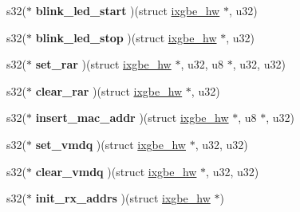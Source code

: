 \begin{DoxyCompactItemize}
\item 
\hypertarget{structixgbe__mac__operations_a2e0ac2fce8719c6d2319c512eb90a2a0}{
s32($\ast$ {\bfseries blink\_\-led\_\-start} )(struct \hyperlink{structixgbe__hw}{ixgbe\_\-hw} $\ast$, u32)}
\label{structixgbe__mac__operations_a2e0ac2fce8719c6d2319c512eb90a2a0}

\item 
\hypertarget{structixgbe__mac__operations_ab724c429efec4b4d0bd234b26ad47980}{
s32($\ast$ {\bfseries blink\_\-led\_\-stop} )(struct \hyperlink{structixgbe__hw}{ixgbe\_\-hw} $\ast$, u32)}
\label{structixgbe__mac__operations_ab724c429efec4b4d0bd234b26ad47980}

\item 
\hypertarget{structixgbe__mac__operations_a237a0034c92965f8e510e83bd0f10d14}{
s32($\ast$ {\bfseries set\_\-rar} )(struct \hyperlink{structixgbe__hw}{ixgbe\_\-hw} $\ast$, u32, u8 $\ast$, u32, u32)}
\label{structixgbe__mac__operations_a237a0034c92965f8e510e83bd0f10d14}

\item 
\hypertarget{structixgbe__mac__operations_a63468301a9ec3390f58f1efd3a36a29f}{
s32($\ast$ {\bfseries clear\_\-rar} )(struct \hyperlink{structixgbe__hw}{ixgbe\_\-hw} $\ast$, u32)}
\label{structixgbe__mac__operations_a63468301a9ec3390f58f1efd3a36a29f}

\item 
\hypertarget{structixgbe__mac__operations_abcef070126fbd0a876d01104495ae9b7}{
s32($\ast$ {\bfseries insert\_\-mac\_\-addr} )(struct \hyperlink{structixgbe__hw}{ixgbe\_\-hw} $\ast$, u8 $\ast$, u32)}
\label{structixgbe__mac__operations_abcef070126fbd0a876d01104495ae9b7}

\item 
\hypertarget{structixgbe__mac__operations_a91fd30a978bc70b9568aef0cc2d6cc9a}{
s32($\ast$ {\bfseries set\_\-vmdq} )(struct \hyperlink{structixgbe__hw}{ixgbe\_\-hw} $\ast$, u32, u32)}
\label{structixgbe__mac__operations_a91fd30a978bc70b9568aef0cc2d6cc9a}

\item 
\hypertarget{structixgbe__mac__operations_a8b5eeca45ba65ce09bc835e9642b070a}{
s32($\ast$ {\bfseries clear\_\-vmdq} )(struct \hyperlink{structixgbe__hw}{ixgbe\_\-hw} $\ast$, u32, u32)}
\label{structixgbe__mac__operations_a8b5eeca45ba65ce09bc835e9642b070a}

\item 
\hypertarget{structixgbe__mac__operations_a7c9b8096382ed138fc2ac7e919f21d1d}{
s32($\ast$ {\bfseries init\_\-rx\_\-addrs} )(struct \hyperlink{structixgbe__hw}{ixgbe\_\-hw} $\ast$)}
\label{structixgbe__mac__operations_a7c9b8096382ed138fc2ac7e919f21d1d}


\end{DoxyCompactItemize}
